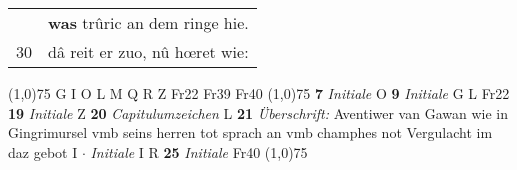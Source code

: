 \documentclass[8pt,a4paper,notitlepage]{article}
\begin{document}
\begin{table}[ht]
\begin{minipage}[t]{0.5\linewidth}
\begin{tabular}{rl}
 & \textbf{was} trûric an dem ringe hie.\\ 
30 & dâ reit er zuo, nû hœret wie:\\ 
\end{tabular}
\scriptsize
\line(1,0){75} \newline
G I O L M Q R Z Fr22 Fr39 Fr40 \newline
\line(1,0){75} \newline
\textbf{7} \textit{Initiale} O  \textbf{9} \textit{Initiale} G L Fr22  \textbf{19} \textit{Initiale} Z  \textbf{20} \textit{Capitulumzeichen} L  \textbf{21} \textit{Überschrift:} Aventiwer van Gawan wie in Gingrimursel vmb seins herren tot sprach an vmb champhes not Vergulacht im daz gebot I   $\cdot$ \textit{Initiale} I R  \textbf{25} \textit{Initiale} Fr40  \newline
\line(1,0){75} \newline

\end{minipage}
\end{table}
\end{document}
